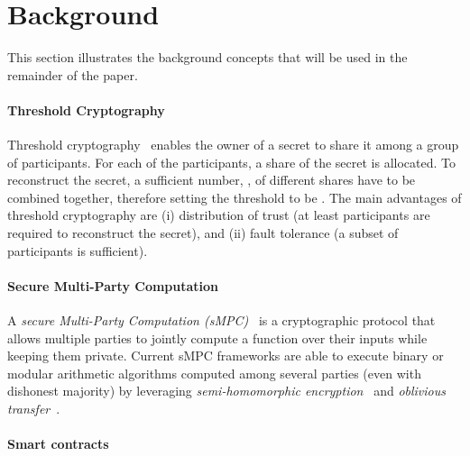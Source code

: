 \vspace*{-2pt}
\section{Background}\label{sect:background}


This section illustrates the background concepts that will be used in the remainder of the paper.

\paragraph*{Threshold Cryptography}

Threshold cryptography~\cite{Shamir:1979:SS:359168.359176} enables the owner of a secret to share it among a group of participants. For each of the \N participants, a share of the secret is allocated. 
To reconstruct the secret, a sufficient number, \K, of different shares have to be combined together, therefore setting the threshold to be \KofN.
The main advantages of threshold cryptography are (i) distribution of trust (at least \K participants are required to reconstruct the secret), and (ii) fault tolerance (a subset of \K participants is sufficient).

\paragraph*{Secure Multi-Party Computation}

A {\em secure Multi-Party Computation (\em sMPC)}~\cite{DBLP:journals/corr/abs-1804-03548,yao82} is a cryptographic protocol that allows multiple parties to jointly compute a function over their inputs while keeping them private.
Current sMPC frameworks are able to execute binary or modular arithmetic algorithms computed among several parties (even with dishonest majority) by leveraging {\em semi-homomorphic encryption}~\cite{spdz,keller2018overdrive} and {\em oblivious transfer}~\cite{mascot,rabin2005exchange}.

\paragraph*{Smart contracts}

